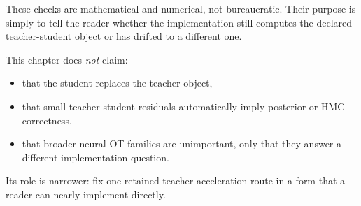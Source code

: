 These checks are mathematical and numerical, not bureaucratic.  Their purpose is
simply to tell the reader whether the implementation still computes the declared
teacher-student object or has drifted to a different one.

This chapter does \emph{not} claim:
\begin{itemize}
  \item that the student replaces the teacher object,
  \item that small teacher-student residuals automatically imply posterior or HMC
  correctness,
  \item that broader neural OT families are unimportant, only that they answer a
  different implementation question.
\end{itemize}
Its role is narrower: fix one retained-teacher acceleration route in a form that
a reader can nearly implement directly.

\FloatBarrier
